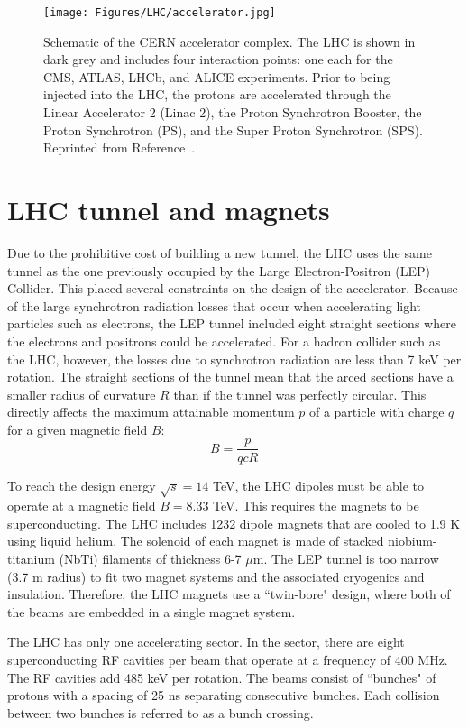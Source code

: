 \begin{figure*}[h!]
	\centering
	\texttt{[image: Figures/LHC/accelerator.jpg]}
       \caption{Schematic of the CERN accelerator complex. The LHC is shown in dark grey and includes four interaction points: one each for the CMS, ATLAS, LHCb, and ALICE experiments. Prior to being injected into the LHC, the protons are accelerated through the Linear Accelerator 2 (Linac 2), the Proton Synchrotron Booster, the Proton Synchrotron (PS), and the Super Proton Synchrotron (SPS). Reprinted from Reference~\cite{CDS}.}
       \label{fig:accelerator}
\end{figure*}

\section{LHC tunnel and magnets}
\label{sec:tunnel}

Due to the prohibitive cost of building a new tunnel, the LHC uses the same tunnel as the one previously occupied by the Large Electron-Positron (LEP) Collider. This placed several constraints on the design of the accelerator. Because of the large synchrotron radiation losses that occur when accelerating light particles such as electrons, the LEP tunnel included eight straight sections where the electrons and positrons could be accelerated. For a hadron collider such as the LHC, however, the losses due to synchrotron radiation are less than 7 keV per rotation. The straight sections of the tunnel mean that the arced sections have a smaller radius of curvature $R$ than if the tunnel was perfectly circular. This directly affects the maximum attainable momentum $p$ of a particle with charge $q$ for a given magnetic field $B$:
\begin{equation}
B = \frac{p}{qcR}
\end{equation}

To reach the design energy $\sqrt{s} = 14$ TeV, the LHC dipoles must be able to operate at a magnetic field $B = 8.33$ TeV. This requires the magnets to be superconducting. The LHC includes 1232 dipole magnets that are cooled to 1.9 K using liquid helium. The solenoid of each magnet is made of stacked niobium-titanium (NbTi) filaments of thickness 6-7 $\mu$m. The LEP tunnel is too narrow (3.7 m radius) to fit two magnet systems and the associated cryogenics and insulation. Therefore, the LHC magnets use a ``twin-bore" design, where both of the beams are embedded in a single magnet system.

The LHC has only one accelerating sector. In the sector, there are eight superconducting RF cavities per beam that operate at a frequency of 400 MHz. The RF cavities add 485 keV per rotation. The beams consist of ``bunches" of protons with a spacing of 25 ns separating consecutive bunches. Each collision between two bunches is referred to as a bunch crossing. 

